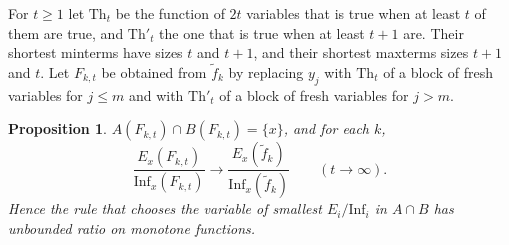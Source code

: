 \documentclass[11pt]{amsart}
\newtheorem{proposition}[theorem]{Proposition}
\theoremstyle{remark}
\newcommand{\Inf}{\mathrm{Inf}}
\begin{document}
For $t\ge1$ let $\mathrm{Th}_t$ be the function of $2t$ variables that is true when at least $t$ of them are true, and $\mathrm{Th}'_t$
the one that is true when at least $t+1$ are. Their shortest minterms have sizes $t$ and $t+1$, and their shortest
maxterms sizes $t+1$ and $t$. Let $F_{k,t}$ be obtained from $\tilde f_k$ by replacing $y_j$ with $\mathrm{Th}_t$ of a block of
fresh variables for $j\le m$ and with $\mathrm{Th}'_t$ of a block of fresh variables for $j>m$.

\begin{proposition}\label{prop:forced}
$A(F_{k,t})\cap B(F_{k,t})=\{x\}$, and for each $k$,
\[
\frac{E_x(F_{k,t})}{\Inf_x(F_{k,t})}\to\frac{E_x(\tilde f_k)}{\Inf_x(\tilde f_k)}\qquad(t\to\infty).
\]
Hence the rule that chooses the variable of smallest $E_i/\Inf_i$ in $A\cap B$ has unbounded ratio on monotone
functions.
\end{proposition}
\end{document}
